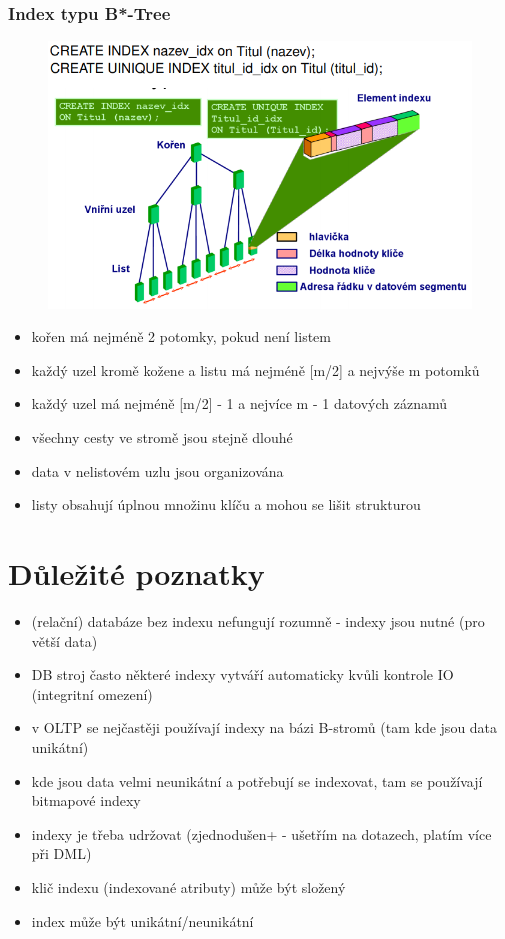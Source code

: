 \documentclass{szzclass}
\begin{document}
\subsubsection{Index typu B*-Tree}
\begin{figure}[h!]
  \centering
  \includegraphics[width = \textwidth]{topics/bi-spol-11/images/bTree.png}
\end{figure}
\begin{itemize}
  \item kořen má nejméně 2 potomky, pokud není listem
  \item každý uzel kromě kožene a listu má nejméně [m/2] a nejvýše m potomků
  \item každý uzel má nejméně [m/2] - 1 a nejvíce m - 1 datových záznamů
  \item všechny cesty ve stromě jsou stejně dlouhé
  \item data v nelistovém uzlu jsou organizována
  \item listy obsahují úplnou množinu klíču a mohou se lišit strukturou
\end{itemize}
\section{Důležité poznatky}
\begin{itemize}
  \item (relační) databáze bez indexu nefungují rozumně - indexy jsou nutné (pro větší data)
  \item DB stroj často některé indexy vytváří automaticky kvůli kontrole IO (integritní omezení)
  \item v OLTP se nejčastěji používají indexy na bázi B-stromů (tam kde jsou data unikátní)
  \item kde jsou data velmi neunikátní a potřebují se indexovat, tam se používají bitmapové indexy
  \item indexy je třeba udržovat (zjednodušen+ - ušetřím na dotazech, platím více při DML)
  \item klič indexu (indexované atributy) může být složený
  \item index může být unikátní/neunikátní
\end{itemize}
\end{document}
